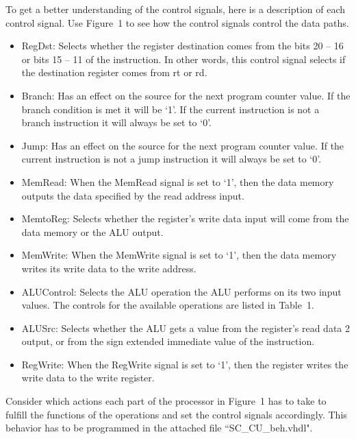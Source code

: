 \documentclass[a4paper,12pt]{article}
\begin{document}
To get a better understanding of the control signals, here is a description of each control signal. Use Figure~1 to see how the control signals control the data paths.
\begin{itemize}

	\item{RegDst: Selects whether the register destination comes from the bits 20 -- 16 or bits 15 -- 11 of the instruction. In other words, this control signal selects if the destination register comes from rt or rd.}

	\item{Branch: Has an effect on the source for the next program counter value. If the branch condition is met it will be `1'. If the current instruction is not a branch instruction it will always be set to `0'.}

	\item{Jump: Has an effect on the source for the next program counter value. If the current instruction is not a jump instruction it will always be set to `0'.}

	\item{MemRead: When the MemRead signal is set to `1', then the data memory outputs the data specified by the read address input.}

	\item{MemtoReg: Selects whether the register's write data input will come from the data memory or the ALU output.}

	\item{MemWrite: When the MemWrite signal is set to `1', then the data memory writes its write data to the write address. }

	\item{ALUControl: Selects the ALU operation the ALU performs on its two input values. The controls for the available operations are listed in Table~1.}

	\item{ALUSrc: Selects whether the ALU gets a value from the register's read data 2 output, or from the sign extended immediate value of the instruction.}

	\item{RegWrite: When the RegWrite signal is set to `1', then the register writes the write data to the write register.\\}
	
\end{itemize}

Consider which actions each part of the processor in Figure~1 has to take to fulfill the functions of the operations and set the control signals accordingly. This behavior has to be programmed in the attached file ``SC\_CU\_beh.vhdl".\\
\end{document}
